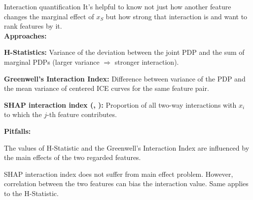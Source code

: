 \documentclass[10pt,compress,t,notes=noshow,xcolor=table]{beamer}
\begin{document}


\begin{framev}[align=top]{Interaction quantification}
It's helpful to know not just how another feature changes the marginal effect of $x_S$ but how strong that interaction is and want to rank features by it.
\\
\spacer[0.25]
\textbf{Approaches:}
\begin{itemizeM}
\item \textbf{H-Statistics:} Variance of the deviation between the joint PDP and the sum of marginal PDPs (larger variance $\Rightarrow$ stronger interaction).
\item \textbf{Greenwell’s Interaction Index:} Difference between variance of the PDP and the mean variance of centered ICE curves for the same feature pair.
\item \textbf{SHAP interaction index (, ):} Proportion of all two-way interactions with $x_i$ to which the $j$-th feature contributes.
\end{itemizeM}
\pause
\textbf{Pitfalls:}
\begin{itemizeM}
\item The values of H-Statistic and the Greenwell’s Interaction Index are influenced by the main effects of the two regarded features.
\item SHAP interaction index does not suffer from main effect problem. However, correlation between the two features can bias the interaction value. Same applies to the H-Statistic.
\end{itemizeM}
\end{framev}
\end{document}
